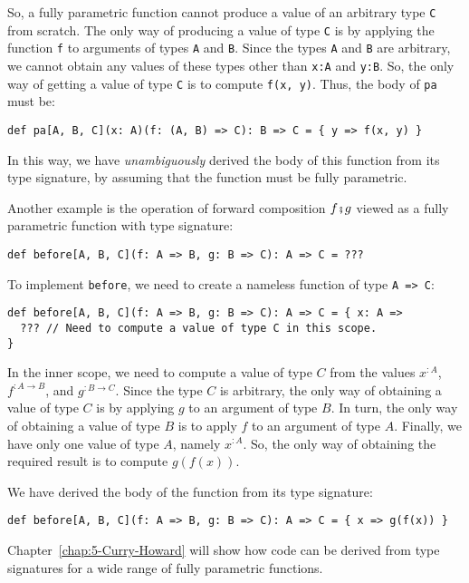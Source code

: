 So, a fully parametric function cannot produce a value of an arbitrary
type \lstinline!C! from scratch. The only way of producing a value
of type \lstinline!C! is by applying the function \lstinline!f!
to arguments of types \lstinline!A! and \lstinline!B!. Since the
types \lstinline!A! and \lstinline!B! are arbitrary, we cannot obtain
any values of these types other than \lstinline!x:A! and \lstinline!y:B!.
So, the only way of getting a value of type \lstinline!C! is to compute
\lstinline!f(x, y)!. Thus, the body of \lstinline!pa! must be:
\begin{lstlisting}
def pa[A, B, C](x: A)(f: (A, B) => C): B => C = { y => f(x, y) }
\end{lstlisting}
In this way, we have \emph{unambiguously} derived the body of this
function from its type signature, by assuming that the function must
be fully parametric.

Another example is the operation of forward composition $f\bef g$
viewed as a fully parametric function with type signature:
\begin{lstlisting}
def before[A, B, C](f: A => B, g: B => C): A => C = ???
\end{lstlisting}
To implement \lstinline!before!, we need to create a nameless function
of type \lstinline!A => C!:
\begin{lstlisting}
def before[A, B, C](f: A => B, g: B => C): A => C = { x: A =>
  ??? // Need to compute a value of type C in this scope.
}
\end{lstlisting}
In the inner scope, we need to compute a value of type $C$ from the
values $x^{:A}$, $f^{:A\rightarrow B}$, and $g^{:B\rightarrow C}$.
Since the type $C$ is arbitrary, the only way of obtaining a value
of type $C$ is by applying $g$ to an argument of type $B$. In turn,
the only way of obtaining a value of type $B$ is to apply $f$ to
an argument of type $A$. Finally, we have only one value of type
$A$, namely $x^{:A}$. So, the only way of obtaining the required
result is to compute $g(f(x))$.

We have derived the body of the function from its type signature:
\begin{lstlisting}
def before[A, B, C](f: A => B, g: B => C): A => C = { x => g(f(x)) }
\end{lstlisting}

Chapter~\ref{chap:5-Curry-Howard} will show how code can be derived
from type signatures for a wide range of fully parametric functions.
